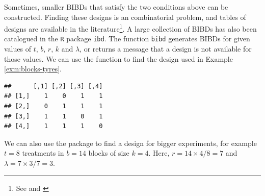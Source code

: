 \documentclass[
]{book}
\newenvironment{Shaded}{\begin{snugshade}}{\end{snugshade}}
\newcommand{\AttributeTok}[1]{\textcolor[rgb]{0.77,0.63,0.00}{#1}}
\newcommand{\CommentTok}[1]{\textcolor[rgb]{0.56,0.35,0.01}{\textit{#1}}}
\newcommand{\DecValTok}[1]{\textcolor[rgb]{0.00,0.00,0.81}{#1}}
\newcommand{\FunctionTok}[1]{\textcolor[rgb]{0.00,0.00,0.00}{#1}}
\newcommand{\NormalTok}[1]{#1}
\newcommand{\OtherTok}[1]{\textcolor[rgb]{0.56,0.35,0.01}{#1}}
\newcommand{\SpecialCharTok}[1]{\textcolor[rgb]{0.00,0.00,0.00}{#1}}
\theoremstyle{definition}
\theoremstyle{definition}
\theoremstyle{definition}
\theoremstyle{definition}
\theoremstyle{remark}
\begin{document}
Sometimes, smaller BIBDs that satisfy the two conditions above can be constructed. Finding these designs is an combinatorial problem, and tables of designs are available in the literature\footnote{See \citet{CochranCox1957} and \citet{FisherYates1963}}. A large collection of BIBDs has also been catalogued in the \texttt{R} package \texttt{ibd}. The function \texttt{bibd} generates BIBDs for given values of \(t\), \(b\), \(r\), \(k\) and \(\lambda\), or returns a message that a design is not available for those values. We can use the function to find the design used in Example \ref{exm:blocks-tyres}.

\begin{Shaded}
\end{Shaded}

\begin{verbatim}
##      [,1] [,2] [,3] [,4]
## [1,]    1    0    1    1
## [2,]    0    1    1    1
## [3,]    1    1    0    1
## [4,]    1    1    1    0
\end{verbatim}

We can also use the package to find a design for bigger experiments, for example \(t=8\) treatments in \(b=14\) blocks of size \(k=4\). Here, \(r = 14\times 4 / 8 = 7\) and \(\lambda = 7 \times 3 / 7 = 3\).

\begin{Shaded}
\end{Shaded}
\end{document}
